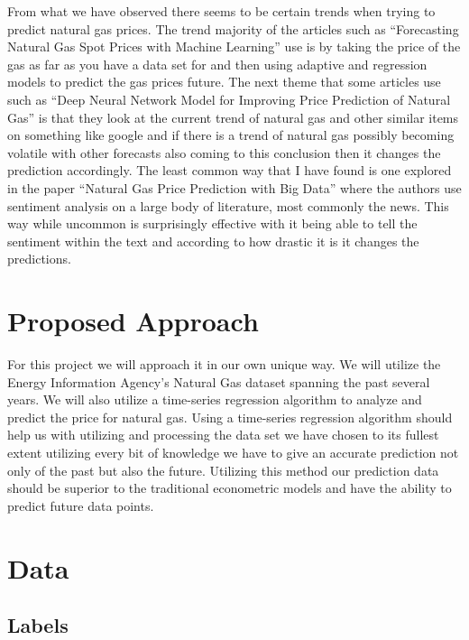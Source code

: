 \documentclass[final]{cvpr}
\begin{document}
    From what we have observed there seems to be certain trends when trying to
    predict natural gas prices. The trend majority of the articles such as
    “Forecasting Natural Gas Spot Prices with Machine Learning” use is by taking
    the price of the gas as far as you have a data set for and then using
    adaptive and regression models to predict the gas prices future. The next
    theme that some articles use such as “Deep Neural Network Model for
    Improving Price Prediction of Natural Gas” is that they look at the current
    trend of natural gas and other similar items on something like google and if
    there is a trend of natural gas possibly becoming volatile with other
    forecasts also coming to this conclusion then it changes the prediction
    accordingly. The least common way that I have found is one explored in the
    paper “Natural Gas Price Prediction with Big Data” where the authors use
    sentiment analysis on a large body of literature, most commonly the news.
    This way while uncommon is surprisingly effective with it being able to tell
    the sentiment within the text and according to how drastic it is it changes
    the predictions.

\section{Proposed Approach}

    For this project we will approach it in our own unique way. We will utilize
    the Energy Information Agency's Natural Gas dataset spanning the past
    several years. We will also utilize a time-series regression algorithm to
    analyze and predict the price for natural gas. Using a time-series
    regression algorithm should help us with utilizing and processing the data
    set we have chosen to its fullest extent utilizing every bit of knowledge we
    have to give an accurate prediction not only of the past but also the
    future. Utilizing this method our prediction data should be superior to the
    traditional econometric models and have the ability to predict future data
    points.

\section{Data}

\subsection{Labels}
\end{document}
